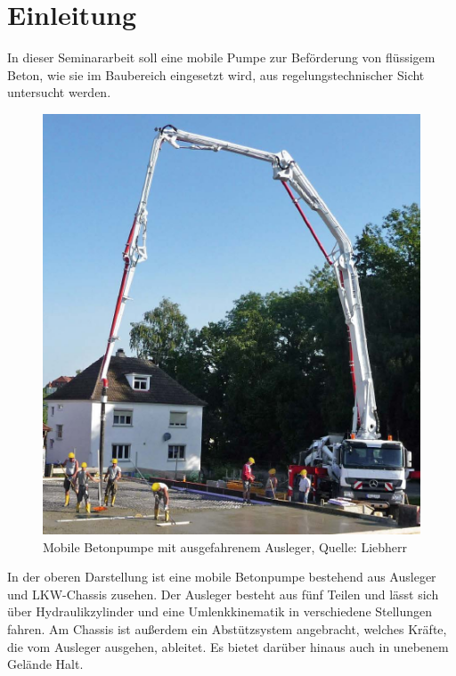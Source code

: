 \chapter{Einleitung}

In dieser Seminararbeit soll eine mobile Pumpe zur Beförderung von flüssigem Beton, wie sie im Baubereich eingesetzt wird, aus regelungstechnischer Sicht untersucht werden.

\begin{figure}[h!]
\centering
\includegraphics[scale=0.6]{betonpumpe.png}
\caption[]{Mobile Betonpumpe mit ausgefahrenem Ausleger, Quelle: Liebherr}
\end{figure}

In der oberen Darstellung ist eine mobile Betonpumpe bestehend aus Ausleger und LKW-Chassis zusehen. Der Ausleger besteht aus fünf Teilen und lässt sich über Hydraulikzylinder und eine Umlenkkinematik in verschiedene Stellungen fahren. Am Chassis ist außerdem ein  Abstützsystem angebracht, welches Kräfte, die vom Ausleger ausgehen, ableitet. Es bietet darüber hinaus auch in unebenem Gelände Halt.\\

